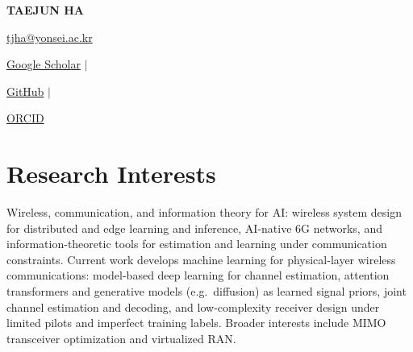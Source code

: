 \documentclass[a4paper,11pt]{article}
\newcommand{\socialicon}[1]{
    \raisebox{-0.05em}{\resizebox{!}{1em}{#1}}
}
\newcommand{\headerfontiii}{\fontfamily{ppl}\selectfont}
\begin{document}
\headerfontiii
\thispagestyle{empty}


\begin{center}
    {\Huge\textbf{TAEJUN HA}}
\end{center}
\vspace{-2mm}

\begin{center}
    \small{\href{mailto:tjha@yonsei.ac.kr}{tjha@yonsei.ac.kr}}
\end{center}
\vspace{-5mm}

\begin{center}
    \small{
        \socialicon{\faGraduationCap}
        \href{https://scholar.google.com/citations?user=SCbCRH0AAAAJ}{Google Scholar}
        $\vert$
        \socialicon{\faGithub}
        \href{https://github.com/TaeJun1999}{GitHub}
        $\vert$
        \socialicon{\faOrcid}
        \href{https://orcid.org/0009-0004-8856-996X}{ORCID}
    }
\end{center}
\vspace{-3mm}


\section{\textbf{Research Interests}}
\vspace{1mm}

\small{
Wireless, communication, and information theory for AI: wireless system design for distributed
and edge learning and inference, AI-native 6G networks, and information-theoretic tools for
estimation and learning under communication constraints. Current work develops machine learning
for physical-layer wireless communications: model-based deep learning for channel estimation,
attention transformers and generative models (e.g.\ diffusion) as learned signal priors, joint
channel estimation and decoding, and low-complexity receiver design under limited pilots and
imperfect training labels. Broader interests include MIMO transceiver optimization and
virtualized RAN.
}

\vspace{-2mm}

\end{document}
